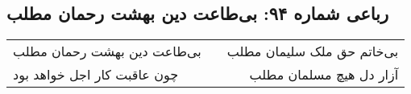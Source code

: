 \begin{center}
\section*{رباعی شماره ۹۴: بی‌طاعت دین بهشت رحمان مطلب}
\label{sec:0094}
\begin{longtable}{l p{0.5cm} r}
بی‌طاعت دین بهشت رحمان مطلب
&&
بی‌خاتم حق ملک سلیمان مطلب
\\
چون عاقبت کار اجل خواهد بود
&&
آزار دل هیچ مسلمان مطلب
\\
\end{longtable}
\end{center}
